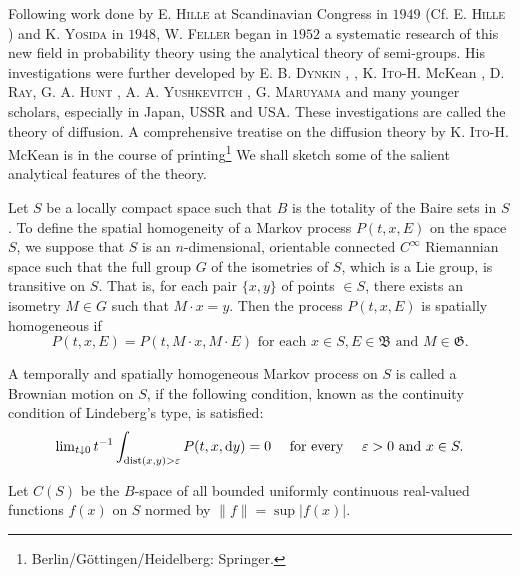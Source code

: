 Following work done by E. \textsc{Hille} at Scandinavian Congress in $1949$ (Cf. E. \textsc{Hille} \cite{hille105}) and K. \textsc{Yosida} \cite{yosida372} in $1948$, W. \textsc{Feller} \cite{erdelyi57} began in $1952$ a systematic research of this new field in probability theory using the analytical theory of semi-groups. His investigations were further developed by E. B. \textsc{Dynkin} \cite{dunford50}, \cite{dunford51}, K. \textsc{Ito}-H. McKean \cite{hunt120}, D. \textsc{Ray}, \cite{ray270} G. A. \textsc{Hunt} \cite{hunt119}, A. A. \textsc{Yushkevitch} \cite{yushkevitch384}, G. \textsc{Maruyama} \cite{maruyama189} and many younger scholars, especially in Japan, USSR and USA. These investigations are called the theory of diffusion. A comprehensive treatise on the diffusion theory by K. \textsc{Ito}-H. McKean \cite{hunt120} is in the course of printing\footnote{Berlin/G\"{o}ttingen/Heidelberg: Springer.} We shall sketch some of the salient analytical features of the theory. 

Let $S$ be a locally compact space such that $B$ is the totality of the Baire sets in $S$. To define the spatial homogeneity of a Markov process $P(t, x, E)$ on the space $S$, we suppose that $S$ is an $n$-dimensional, orientable connected $C^{\infty}$ Riemannian space such that the full group $G$ of the isometries of $S$, which is a Lie group, is transitive on $S$. That is, for each pair $\{x, y\}$ of points $\in S$, there exists an isometry $M \in G$ such that $M \cdot x = y$. Then the process $P(t, x, E)$ is spatially homogeneous if 
\begin{equation}\label{eq:XIII.5.2}
P (t, x, E) = P (t, M \cdot x, M \cdot E) \text{ for each } x \in S, E \in \mathfrak {B} \text{ and } M \in \mathfrak {G}.
\end{equation}

A temporally and spatially homogeneous Markov process on $S$ is called a Brownian motion on $S$, if the following condition, known as the continuity condition of Lindeberg's type, is satisfied: 
\begin{equation}\label{eq:XIII.5.3}
\lim\nolimits _{t \downarrow 0} t ^{-1} \int_ {\operatorname{dist} (x, y) > \varepsilon} P (t, x, \mathop{}\!\mathrm{d} y) = 0 \quad \text{ for every } \quad \varepsilon > 0 \text{ and } x \in S.
\end{equation}

\begin{propositionu} Let $C(S)$ be the $B$-space of all bounded uniformly continuous real-valued functions $f(x)$ on $S$ normed by $\|f\| = \sup |f(x)|$. 
\end{propositionu}

